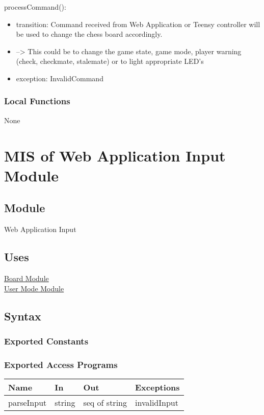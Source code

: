 \documentclass[12pt, titlepage]{article}
\begin{document}
\noindent processCommand():
\begin{itemize}
\item transition: Command received from Web Application or Teensy controller will be used to change the chess board accordingly.
\item --> This could be to change the game state, game mode, player warning (check, checkmate, stalemate) or to light appropriate LED's
\item exception: InvalidCommand
\end{itemize}

\subsubsection{Local Functions}{
  None
}


\newpage

\section{MIS of Web Application Input Module} \label{mInput}

    \subsection{Module}
    Web Application Input

    \subsection{Uses}
    \hyperref[mBoard]{Board Module}\\
    \hyperref[mMode]{User Mode Module}

    \subsection{Syntax}
    \subsubsection{Exported Constants}
    
    \subsubsection{Exported Access Programs}
        \begin{center}
        \begin{tabular}{p{4.5cm} p{3cm} p{4cm} p{2.5cm}}
        \hline
        \textbf{Name} & \textbf{In} & \textbf{Out} & \textbf{Exceptions} \\
        \hline
        parseInput & string & seq of string & invalidInput \\
        \hline
        \end{tabular}
        \end{center}
    
\end{document}
